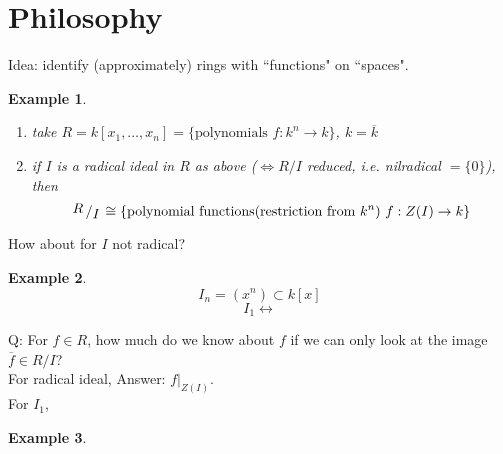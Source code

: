 \documentclass[12pt]{article}
\newcommand{\bigslant}[2]{{\raisebox{.2em}{$#1$}\left/\raisebox{-.2em}{$#2$}\right.}}
\newtheorem*{eg}{Example}
\theoremstyle{definition}
\begin{document}
\section*{Philosophy}
Idea: identify (approximately) rings with ``functions" on ``spaces".
\begin{eg}
\begin{enumerate}
    \item take $R=k[x_1,\dots,x_n] = \{\text{polynomials }f:k^n\rightarrow k\}$, $k=\overline{k}$
    \item if $I$ is a radical ideal in $R$ as above ($\iff R/I$ reduced, i.e. nilradical $=\{0\}$), then
    \[
    \bigslant{R}{I} \cong \{\text{polynomial functions(restriction from $k^n$) }f:Z(I) \rightarrow k\}
    \]
\end{enumerate}
\end{eg}
How about for $I$ not radical?
\begin{eg}
\[
I_n= (x^n) \subset k[x]
\]
\[
I_1 \leftrightarrow 
\]
\end{eg}
Q:
For $f\in R$, how much do we know about $f$ if we can only look at the image $\overline{f}\in R/I$?\\
For radical ideal, Answer: $f|_{Z(I)}$. \\
For $I_1$, 

\begin{eg}

\end{eg}
\end{document}
